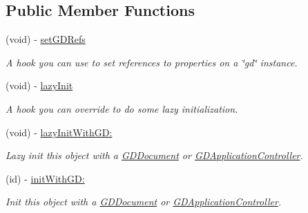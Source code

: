 \subsection*{Public Member Functions}
\begin{DoxyCompactItemize}
\item 
\hypertarget{interface_g_d_base_object_ae78c37cd75eff85b5e71ab3daa7deae0}{
(void) -\/ \hyperlink{interface_g_d_base_object_ae78c37cd75eff85b5e71ab3daa7deae0}{setGDRefs}}
\label{interface_g_d_base_object_ae78c37cd75eff85b5e71ab3daa7deae0}

\begin{DoxyCompactList}\small\item\em A hook you can use to set references to properties on a \char`\"{}gd\char`\"{} instance. \item\end{DoxyCompactList}\item 
(void) -\/ \hyperlink{interface_g_d_base_object_a5a8c3d322aa160d7dc572d17c928b56e}{lazyInit}
\begin{DoxyCompactList}\small\item\em A hook you can override to do some lazy initialization. \item\end{DoxyCompactList}\item 
(void) -\/ \hyperlink{interface_g_d_base_object_a5c80c746c3a6a2455d43aa12cf87a423}{lazyInitWithGD:}
\begin{DoxyCompactList}\small\item\em Lazy init this object with a \hyperlink{interface_g_d_document}{GDDocument} or \hyperlink{interface_g_d_application_controller}{GDApplicationController}. \item\end{DoxyCompactList}\item 
(id) -\/ \hyperlink{interface_g_d_base_object_a6cdf46de7ef7fd88ef83a827385ae816}{initWithGD:}
\begin{DoxyCompactList}\small\item\em Init this object with a \hyperlink{interface_g_d_document}{GDDocument} or \hyperlink{interface_g_d_application_controller}{GDApplicationController}. \item\end{DoxyCompactList}\end{DoxyCompactItemize}
